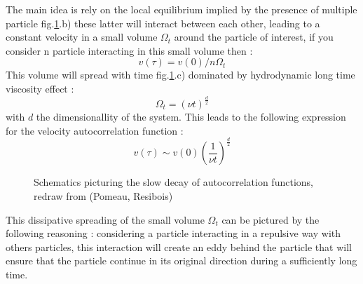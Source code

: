 \documentclass[ansiapaper]{report}
\begin{document}
\begin{multicols}{3}
The main idea is rely on the local equilibrium implied by the presence of multiple particle fig.\ref{fig:long_time_tail}.b) these latter will interact between each other, leading to a constant velocity in a small volume $\Omega_t$ around the particle of interest, if you consider n particle interacting in this small volume then : 
 $$v(\tau) = v(0)/n \Omega_t$$
 This volume will spread with time fig.\ref{fig:long_time_tail}.c) dominated by hydrodynamic long time viscosity effect : $$\Omega_t = (\nu t)^{\frac{d}{2}}$$ with $d$ the dimensionallity of the system. This leads to the following expression for the velocity autocorrelation function : 
 \begin{equation}
     v(\tau) \sim  v(0) \left( \frac{1}{\nu t} \right)^{\frac{d}{2}}     
    \label{eq:long_time_tail}
 \end{equation}
\begin{figure}[H]
		\def\svgwidth{\linewidth}
		
        \caption{Schematics picturing the slow decay of autocorrelation functions, redraw from (Pomeau, Resibois)}
        \vspace{0.15cm}
        \label{fig:long_time_tail}
\end{figure}

This dissipative spreading of the small volume $\Omega_t$ can be pictured by the following reasoning : considering a particle interacting in a repulsive way with others particles, this interaction will create an eddy behind the particle that will ensure that the particle continue in its original direction during a sufficiently long time. 

\end{multicols}
\end{document}
